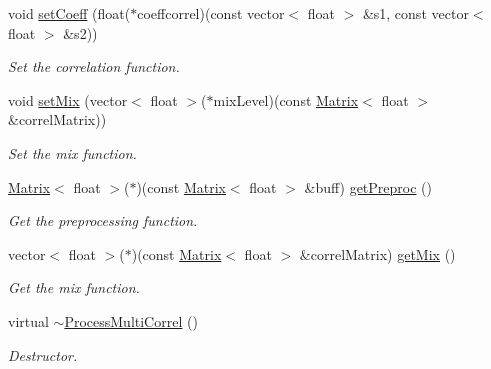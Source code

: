 \begin{DoxyCompactItemize}
void \mbox{\hyperlink{class_process_multi_correl_aebafeaade18f20edb6d4f3cffa712543}{set\+Coeff}} (float($\ast$coeffcorrel)(const vector$<$ float $>$ \&s1, const vector$<$ float $>$ \&s2))
\begin{DoxyCompactList}\small\item\em Set the correlation function. \end{DoxyCompactList}\item 
void \mbox{\hyperlink{class_process_multi_correl_a59a1bce24ce64616e4c3e3f625313555}{set\+Mix}} (vector$<$ float $>$($\ast$mix\+Level)(const \mbox{\hyperlink{class_matrix}{Matrix}}$<$ float $>$ \&correl\+Matrix))
\begin{DoxyCompactList}\small\item\em Set the mix function. \end{DoxyCompactList}\item 
\mbox{\hyperlink{class_matrix}{Matrix}}$<$ float $>$($\ast$)(const \mbox{\hyperlink{class_matrix}{Matrix}}$<$ float $>$ \&buff) \mbox{\hyperlink{class_process_multi_correl_ae2afc5446a944d835509a8cc68ba4d35}{get\+Preproc}} ()
\begin{DoxyCompactList}\small\item\em Get the preprocessing function. \end{DoxyCompactList}\item 
vector$<$ float $>$($\ast$)(const \mbox{\hyperlink{class_matrix}{Matrix}}$<$ float $>$ \&correl\+Matrix) \mbox{\hyperlink{class_process_multi_correl_a39a8d59325d79ad328036fd302070617}{get\+Mix}} ()
\begin{DoxyCompactList}\small\item\em Get the mix function. \end{DoxyCompactList}\item 
virtual \mbox{\hyperlink{class_process_multi_correl_a6ae612212661ea6b86fe1342581096cc}{$\sim$\+Process\+Multi\+Correl}} ()
\begin{DoxyCompactList}\small\item\em Destructor. \end{DoxyCompactList}\end{DoxyCompactItemize}
